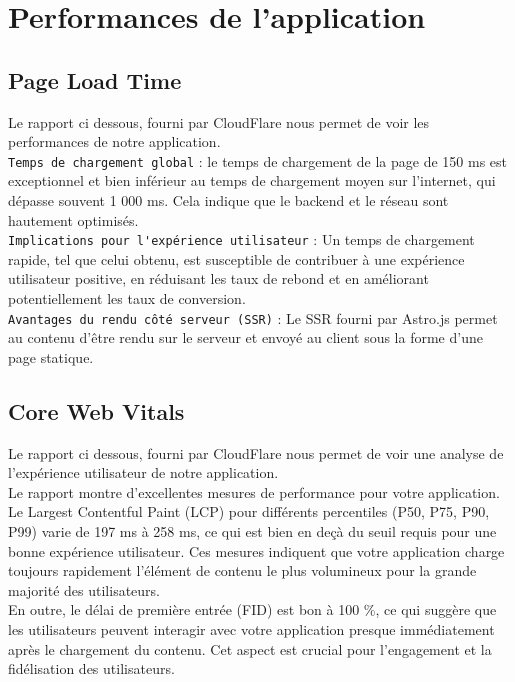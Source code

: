 \documentclass[12pt, a4paper, oneside]{thesis}
\begin{document}
\newpage
\section{Performances de l'application}

\subsection{Page Load Time}

Le rapport ci dessous, fourni par CloudFlare nous permet de voir les performances de notre application.\\

\verb|Temps de chargement global| : le temps de chargement de la page de 150 ms est exceptionnel et bien inférieur au temps de chargement moyen sur l'internet, qui dépasse souvent 1 000 ms. Cela indique que le backend et le réseau sont hautement optimisés.\\

\verb|Implications pour l'expérience utilisateur| : Un temps de chargement rapide, tel que celui obtenu, est susceptible de contribuer à une expérience utilisateur positive, en réduisant les taux de rebond et en améliorant potentiellement les taux de conversion.\\
\verb|Avantages du rendu côté serveur (SSR)| : Le SSR fourni par Astro.js permet au contenu d'être rendu sur le serveur et envoyé au client sous la forme d'une page statique.\\

\subsection{Core Web Vitals}

Le rapport ci dessous, fourni par CloudFlare nous permet de voir une analyse de l'expérience utilisateur de notre application.\\

Le rapport montre d'excellentes mesures de performance pour votre application. Le Largest Contentful Paint (LCP) pour différents percentiles (P50, P75, P90, P99) varie de 197 ms à 258 ms, ce qui est bien en deçà du seuil requis pour une bonne expérience utilisateur. Ces mesures indiquent que votre application charge toujours rapidement l'élément de contenu le plus volumineux pour la grande majorité des utilisateurs.\\

En outre, le délai de première entrée (FID) est bon à 100 \%, ce qui suggère que les utilisateurs peuvent interagir avec votre application presque immédiatement après le chargement du contenu. Cet aspect est crucial pour l'engagement et la fidélisation des utilisateurs.\\
\end{document}
